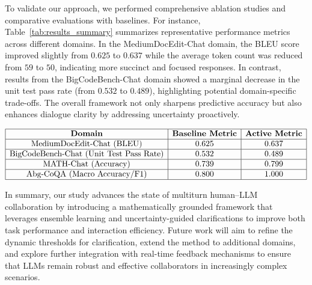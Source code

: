 \documentclass{article} %
\begin{document}
To validate our approach, we performed comprehensive ablation studies and comparative evaluations with baselines. For instance, Table~\ref{tab:results_summary} summarizes representative performance metrics across different domains. In the MediumDocEdit-Chat domain, the BLEU score improved slightly from \(0.625\) to \(0.637\) while the average token count was reduced from \(59\) to \(50\), indicating more succinct and focused responses. In contrast, results from the BigCodeBench-Chat domain showed a marginal decrease in the unit test pass rate (from \(0.532\) to \(0.489\)), highlighting potential domain-specific trade-offs. The overall framework not only sharpens predictive accuracy but also enhances dialogue clarity by addressing uncertainty proactively.

\[
\begin{array}{|c|c|c|}
\hline
\textbf{Domain} & \textbf{Baseline Metric} & \textbf{Active Metric} \\
\hline
\text{MediumDocEdit-Chat (BLEU)} & 0.625 & 0.637 \\
\hline
\text{BigCodeBench-Chat (Unit Test Pass Rate)} & 0.532 & 0.489 \\
\hline
\text{MATH-Chat (Accuracy)} & 0.739 & 0.799 \\
\hline
\text{Abg-CoQA (Macro Accuracy/F1)} & 0.800 & 1.000 \\
\hline
\end{array}
\]
\label{tab:results_summary}

In summary, our study advances the state of multiturn human–LLM collaboration by introducing a mathematically grounded framework that leverages ensemble learning and uncertainty-guided clarifications to improve both task performance and interaction efficiency. Future work will aim to refine the dynamic thresholds for clarification, extend the method to additional domains, and explore further integration with real-time feedback mechanisms to ensure that LLMs remain robust and effective collaborators in increasingly complex scenarios.
\end{document}
